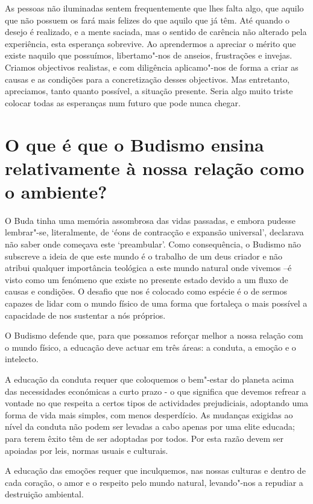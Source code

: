 As pessoas não iluminadas sentem frequentemente que lhes falta algo, que
aquilo que não possuem os fará mais felizes do que aquilo que já têm.
Até quando o desejo é realizado, e a mente saciada, mas o sentido de
carência não alterado pela experiência, esta esperança sobrevive. Ao
aprendermos a apreciar o mérito que existe naquilo que possuímos,
libertamo"-nos de anseios, frustrações e invejas. Criamos objectivos
realistas, e com diligência aplicamo"-nos de forma a criar as causas e as
condições para a concretização desses objectivos. Mas entretanto,
apreciamos, tanto quanto possível, a situação presente. Seria algo muito
triste colocar todas as esperanças num futuro que pode nunca chegar.

\section{O que é que o Budismo ensina relativamente à nossa relação como o
  ambiente?}

\enlargethispage{\baselineskip}

O Buda tinha uma memória assombrosa das vidas passadas, e embora pudesse
lembrar"-se, literalmente, de `éons de contracção e expansão
universal', declarava não saber onde começava este `preambular'. Como
consequência, o Budismo não subscreve a ideia de que este mundo é o
trabalho de um deus criador e não atribui qualquer importância teológica
a este mundo natural onde vivemos --é visto como um fenómeno que existe
no presente estado devido a um fluxo de causas e condições. O desafio
que nos é colocado como espécie é o de sermos capazes de lidar com o
mundo físico de uma forma que fortaleça o mais possível a capacidade de
nos sustentar a nós próprios.

O Budismo defende que, para que possamos reforçar melhor a nossa relação
com o mundo físico, a educação deve actuar em três áreas: a conduta, a
emoção e o intelecto.

A educação da conduta requer que coloquemos o bem"-estar do planeta acima
das necessidades económicas a curto prazo - o que significa que devemos
refrear a vontade no que respeita a certos tipos de actividades
prejudiciais, adoptando uma forma de vida mais simples, com menos
desperdício. As mudanças exigidas ao nível da conduta não podem ser
levadas a cabo apenas por uma elite educada; para terem êxito têm de ser
adoptadas por todos. Por esta razão devem ser apoiadas por leis, normas
usuais e culturais.

A educação das emoções requer que inculquemos, nas nossas culturas e
dentro de cada coração, o amor e o respeito pelo mundo natural,
levando"-nos a repudiar a destruição ambiental.

